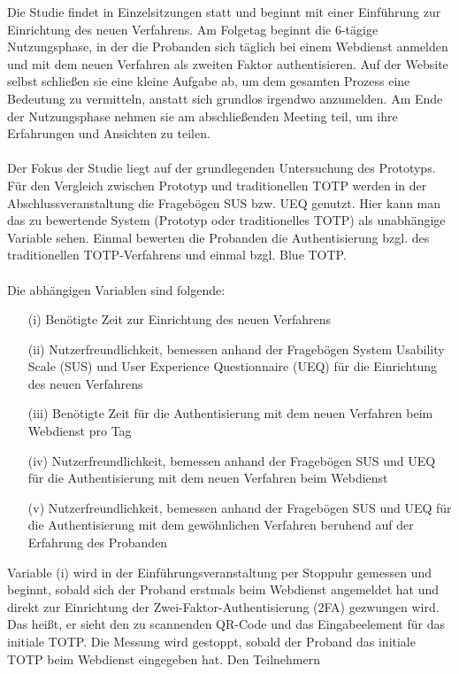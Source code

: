 Die Studie findet in Einzelsitzungen statt und beginnt mit einer Einführung zur 
Einrichtung des neuen Verfahrens. Am Folgetag beginnt die 6-tägige 
Nutzungsphase, in der die Probanden sich täglich bei einem Webdienst anmelden 
und mit dem neuen Verfahren als zweiten Faktor authentisieren. Auf der Website 
selbst schließen sie eine kleine Aufgabe ab, um dem gesamten Prozess eine Bedeutung zu vermitteln, anstatt sich grundlos irgendwo anzumelden. Am Ende der Nutzungsphase nehmen sie am abschließenden Meeting teil, 
um ihre Erfahrungen und Ansichten zu teilen.
\\\\
Der Fokus der Studie liegt auf der grundlegenden Untersuchung des Prototyps. Für den Vergleich zwischen Prototyp und traditionellen TOTP werden in der Abschlussveranstaltung die Fragebögen SUS bzw. UEQ genutzt. Hier kann man das zu bewertende System (Prototyp oder traditionelles TOTP) als unabhängige Variable sehen. Einmal bewerten die Probanden die Authentisierung bzgl. des traditionellen TOTP-Verfahrens und einmal bzgl. Blue TOTP.
\\\\
Die abhängigen Variablen sind folgende:
\begin{itemize}
    \item [(i)] Benötigte Zeit zur Einrichtung des neuen Verfahrens
    \item [(ii)] Nutzerfreundlichkeit, bemessen anhand der Fragebögen System Usability Scale (SUS) und User Experience Questionnaire (UEQ) für die Einrichtung des neuen Verfahrens
    \item [(iii)] Benötigte Zeit für die Authentisierung mit dem neuen Verfahren beim Webdienst pro Tag
    \item [(iv)] Nutzerfreundlichkeit, bemessen anhand der Fragebögen SUS und UEQ für die Authentisierung mit dem neuen Verfahren beim Webdienst
    \item [(v)] Nutzerfreundlichkeit, bemessen anhand der Fragebögen SUS und UEQ für die Authentisierung mit dem gewöhnlichen Verfahren beruhend auf der Erfahrung des Probanden
\end{itemize}
Variable (i) wird in der Einführungsveranstaltung per Stoppuhr gemessen und 
beginnt, sobald sich der Proband erstmals beim Webdienst angemeldet hat und 
direkt zur Einrichtung der Zwei-Faktor-Authentisierung (2FA) gezwungen wird. Das 
heißt, er sieht den zu scannenden QR-Code und das Eingabeelement für das initiale 
TOTP. 
Die Messung wird gestoppt, sobald der Proband das initiale TOTP beim Webdienst eingegeben hat. Den Teilnehmern 

